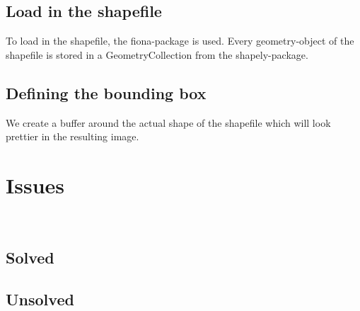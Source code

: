 \documentclass[10pt, a4paper]{article}
\begin{document}
\subsection{Load in the shapefile}
To load in the shapefile, the fiona-package is used. Every geometry-object of the shapefile is stored in a GeometryCollection from the shapely-package.

\subsection{Defining the bounding box}
We create a buffer around the actual shape of the shapefile which will look prettier in the resulting image. 





\section{Issues}
\
\subsection{Solved}
\subsection{Unsolved}


\begin{figure}[!htbp]
	\centering
\end{figure}
\end{document}
